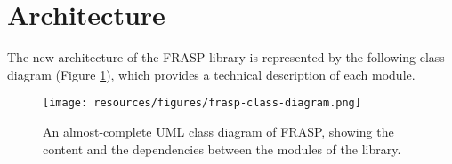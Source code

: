 
\section{Architecture}
\label{section:implementation:architecture}

The new architecture of the FRASP library is represented by the following class
diagram (Figure \ref{figure:frasp-class-diagram}), which provides a technical
description of each module.

\begin{figure}[!ht]
  \centering
  \texttt{[image: resources/figures/frasp-class-diagram.png]}
  \caption{
    An almost-complete UML class diagram of FRASP, showing the
    content and the dependencies between the modules of the library.
  }
  \label{figure:frasp-class-diagram}
\end{figure}
